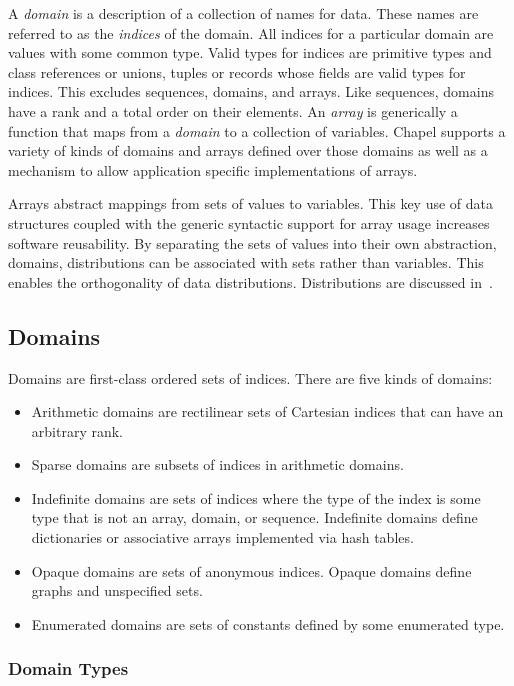 \label{Domains_and_Arrays}

A {\em domain} is a description of a collection of names for data.
These names are referred to as the {\em indices} of the domain.  All
indices for a particular domain are values with some common type.
Valid types for indices are primitive types and class references or
unions, tuples or records whose fields are valid types for indices.
This excludes sequences, domains, and arrays.  Like sequences, domains
have a rank and a total order on their elements.  An {\em array} is
generically a function that maps from a {\em domain} to a collection
of variables.  Chapel supports a variety of kinds of domains and
arrays defined over those domains as well as a mechanism to allow
application specific implementations of arrays.

Arrays abstract mappings from sets of values to variables.  This key
use of data structures coupled with the generic syntactic support for
array usage increases software reusability.  By separating the sets of
values into their own abstraction, domains, distributions can be
associated with sets rather than variables.  This enables the
orthogonality of data distributions.  Distributions are discussed
in~.

\subsection{Domains}
\label{Domains}

Domains are first-class ordered sets of indices.  There are five kinds
of domains:
\begin{itemize}
\item
Arithmetic domains are rectilinear sets of Cartesian indices that can
have an arbitrary rank.
\item
Sparse domains are subsets of indices in arithmetic domains.
\item
Indefinite domains are sets of indices where the type of the index is
some type that is not an array, domain, or sequence.  Indefinite
domains define dictionaries or associative arrays implemented via hash
tables.
\item
Opaque domains are sets of anonymous indices.  Opaque domains define
graphs and unspecified sets.
\item
Enumerated domains are sets of constants defined by some enumerated
type.
\end{itemize}

\subsubsection{Domain Types}
\label{Domain_Types}

